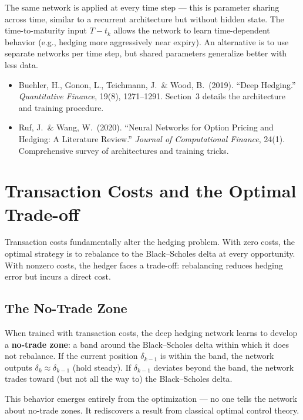 \documentclass[11pt, a4paper]{article}
\theoremstyle{definition}
\theoremstyle{plain}
\theoremstyle{remark}
\begin{document}
\begin{warningbox}
The same network is applied at every time step --- this is parameter sharing across time,
similar to a recurrent architecture but without hidden state.
The time-to-maturity input $T - t_k$ allows the network to learn time-dependent behavior
(e.g., hedging more aggressively near expiry).
An alternative is to use separate networks per time step,
but shared parameters generalize better with less data.
\end{warningbox}

\begin{refbox}
\begin{itemize}
    \item Buehler, H., Gonon, L., Teichmann, J.\ \& Wood, B.\ (2019).
          ``Deep Hedging.'' \emph{Quantitative Finance}, 19(8), 1271--1291.
          Section~3 details the architecture and training procedure.
    \item Ruf, J.\ \& Wang, W.\ (2020).
          ``Neural Networks for Option Pricing and Hedging: A Literature Review.''
          \emph{Journal of Computational Finance}, 24(1).
          Comprehensive survey of architectures and training tricks.
\end{itemize}
\end{refbox}

\section{Transaction Costs and the Optimal Trade-off}
\label{sec:transaction-costs}

Transaction costs fundamentally alter the hedging problem.
With zero costs, the optimal strategy is to rebalance to the Black--Scholes delta
at every opportunity.
With nonzero costs, the hedger faces a trade-off:
rebalancing reduces hedging error but incurs a direct cost.

\subsection{The No-Trade Zone}

\begin{keyidea}
When trained with transaction costs, the deep hedging network learns to develop
a \textbf{no-trade zone}: a band around the Black--Scholes delta
within which it does not rebalance.
If the current position $\delta_{k-1}$ is within the band, the network outputs
$\delta_k \approx \delta_{k-1}$ (hold steady).
If $\delta_{k-1}$ deviates beyond the band, the network trades toward
(but not all the way to) the Black--Scholes delta.

This behavior emerges entirely from the optimization ---
no one tells the network about no-trade zones.
It rediscovers a result from classical optimal control theory.
\end{keyidea}
\end{document}
